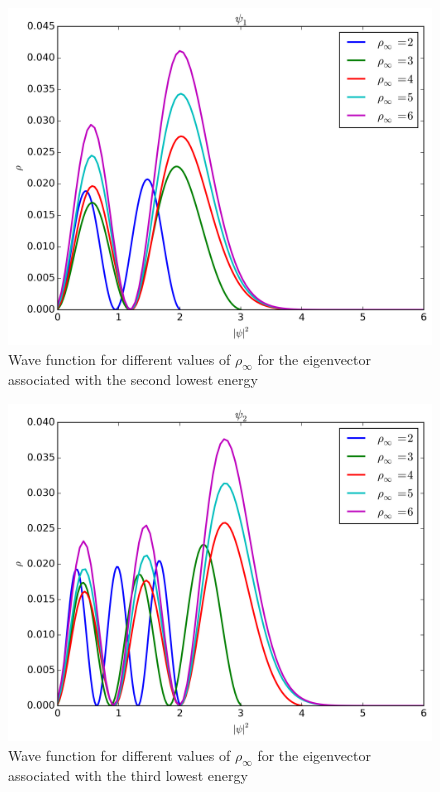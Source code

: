 \documentclass[11pt,a4paper,english,draft]{article}
\numberwithin{equation}{section}
\newcommand{\figurewidth}{.85\textwidth}
\begin{document}
\begin{figure}
\centering
\includegraphics[width=\figurewidth]{../results/psi_inf_compare_psi1.png}
\caption{Wave function for different values of $\rho_\infty$ for
the eigenvector associated with the second lowest energy}
\label{fig:psi1rho}
\end{figure}

\begin{figure}
\centering
\includegraphics[width=\figurewidth]{../results/psi_inf_compare_psi2.png}
\caption{Wave function for different values of $\rho_\infty$ for
the eigenvector associated with the third lowest energy}
\label{fig:psi2rho}
\end{figure}
\end{document}
